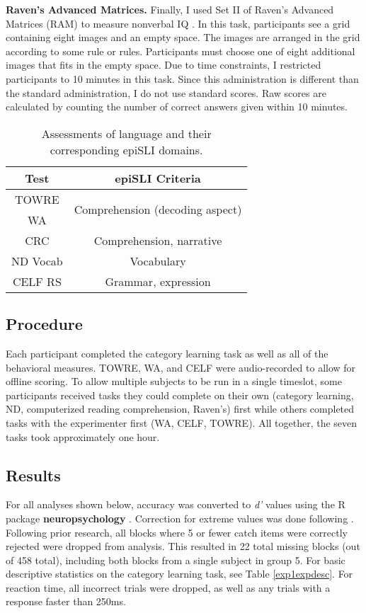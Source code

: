 \documentclass[../dissertation.tex]{subfiles}
\begin{document}
	\textbf{Raven's Advanced Matrices.} Finally, I used Set II of Raven's Advanced Matrices (RAM) to measure nonverbal IQ \citep{Raven1998}. In this task, participants see a grid containing eight images and an empty space. The images are arranged in the grid according to some rule or rules. Participants must choose one of eight additional images that fits in the empty space. Due to time constraints, I restricted participants to 10 minutes in this task. Since this administration is different than the standard administration, I do not use standard scores. Raw scores are calculated by counting the number of correct answers given within 10 minutes.

\begin{table}[H]
\caption{Assessments of language and their corresponding epiSLI domains.}
\vspace{-10pt}
\begin{center}
\begin{tabular}{ c|c } 
 \hline 
 Test & epiSLI Criteria \\ 
 \hline
 TOWRE & \multirow{2}{*}{Comprehension (decoding aspect)}\\ 
 WA & \\ 
 CRC & Comprehension, narrative \\
 ND Vocab & Vocabulary \\ 
 CELF RS & Grammar, expression \\ 
 \hline
\end{tabular}
\end{center}
\label{slitable}
\end{table}


\subsection{Procedure}
	Each participant completed the category learning task as well as all of the behavioral measures. TOWRE, WA, and CELF were audio-recorded to allow for offline scoring. To allow multiple subjects to be run in a single timeslot, some participants received tasks they could complete on their own (category learning, ND, computerized reading comprehension, Raven's) first while others completed tasks with the experimenter first (WA, CELF, TOWRE). All together, the seven tasks took approximately one hour.
	
\subsection{Results}
	For all analyses shown below, accuracy was converted to \textit{d'} values \citep{macmillan2004} using the R package \textbf{neuropsychology} \citep{neuropsych}. Correction for extreme values was done following \citep{Hautus1995}. Following prior research, all blocks where 5 or fewer catch items were correctly rejected were dropped from analysis. This resulted in 22 total missing blocks (out of 458 total), including both blocks from a single subject in group 5. For basic descriptive statistics on the category learning task, see Table \ref{exp1expdesc}. For reaction time, all incorrect trials were dropped, as well as any trials with a response faster than 250ms.  \par
\end{document}
